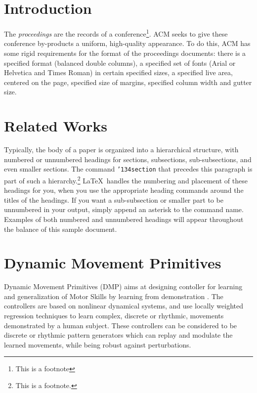 \documentclass[sigconf]{acmart}
\begin{document}




\maketitle

\section{Introduction}

The \textit{proceedings} are the records of a conference\footnote{This
is a footnote}.  ACM seeks
to give these conference by-products a uniform, high-quality
appearance.  To do this, ACM has some rigid requirements for the
format of the proceedings documents: there is a specified format
(balanced double columns), a specified set of fonts (Arial or
Helvetica and Times Roman) in certain specified sizes, a specified
live area, centered on the page, specified size of margins, specified
column width and gutter size.

\section{Related Works}
Typically, the body of a paper is organized into a hierarchical
structure, with numbered or unnumbered headings for sections,
subsections, sub-subsections, and even smaller sections.  The command
\texttt{{\char'134}section} that precedes this paragraph is part of
such a hierarchy.\footnote{This is a footnote.} \LaTeX\ handles the
numbering and placement of these headings for you, when you use the
appropriate heading commands around the titles of the headings.  If
you want a sub-subsection or smaller part to be unnumbered in your
output, simply append an asterisk to the command name.  Examples of
both numbered and unnumbered headings will appear throughout the
balance of this sample document.

\section{Dynamic Movement Primitives}
Dynamic Movement Primitives (DMP) aims at designing contoller for learning and generalization of Motor Skills by learning from demonstration \cite{ijspeert2013dynamical}. The controllers are based on nonlinear dynamical systems, and use locally weighted regression techniques to learn complex, discrete or rhythmic, movements demonstrated by a human subject. These controllers can be considered to be discrete or rhythmic pattern generators which can replay and modulate the learned movements, while being robust against perturbations. 
\end{document}

